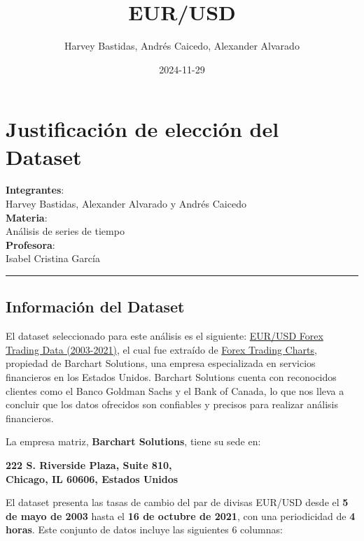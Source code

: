 \documentclass[
]{book}
\title{EUR/USD}
\author{Harvey Bastidas, Andrés Caicedo, Alexander Alvarado}
\date{2024-11-29}
\begin{document}
\maketitle

{
\setcounter{tocdepth}{1}
\tableofcontents
}
\chapter{Justificación de elección del Dataset}\label{justificaciuxf3n-de-elecciuxf3n-del-dataset}

\textbf{Integrantes}:\\
Harvey Bastidas, Alexander Alvarado y Andrés Caicedo\\
\textbf{Materia}:\\
Análisis de series de tiempo\\
\textbf{Profesora}:\\
Isabel Cristina García

\begin{center}\rule{0.5\linewidth}{0.5pt}\end{center}

\section{Información del Dataset}\label{informaciuxf3n-del-dataset}

El dataset seleccionado para este análisis es el siguiente: \href{https://www.kaggle.com/datasets/chandrimad31/eurusd-forex-trading-data-20032021}{EUR/USD Forex Trading Data (2003-2021)}, el cual fue extraído de \href{https://forex.tradingcharts.com/}{Forex Trading Charts}, propiedad de Barchart Solutions, una empresa especializada en servicios financieros en los Estados Unidos. Barchart Solutions cuenta con reconocidos clientes como el Banco Goldman Sachs y el Bank of Canada, lo que nos lleva a concluir que los datos ofrecidos son confiables y precisos para realizar análisis financieros.

La empresa matriz, \textbf{Barchart Solutions}, tiene su sede en:

\textbf{222 S. Riverside Plaza, Suite 810,\\
Chicago, IL 60606, Estados Unidos}

El dataset presenta las tasas de cambio del par de divisas EUR/USD desde el \textbf{5 de mayo de 2003} hasta el \textbf{16 de octubre de 2021}, con una periodicidad de \textbf{4 horas}. Este conjunto de datos incluye las siguientes 6 columnas:
\end{document}

